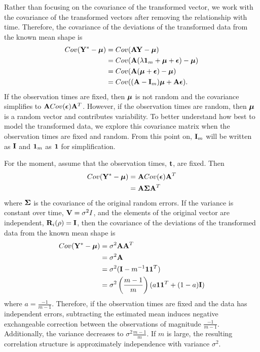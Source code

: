 Rather than focusing on the covariance of the transformed vector, we work with the covariance of the transformed vectors after removing the relationship with time. Therefore, the covariance of the deviations of the transformed data from the known mean shape is
\begin{align*}
Cov(\mathbf Y^{*} - \boldsymbol\mu) &= Cov(\mathbf A\mathbf Y - \boldsymbol\mu)\\
&= Cov(\mathbf A(\lambda\mathbf 1_{m} + \boldsymbol\mu + \boldsymbol\epsilon) - \boldsymbol\mu)\\
&= Cov(\mathbf A(\boldsymbol\mu + \boldsymbol\epsilon) - \boldsymbol\mu)\\
&= Cov((\mathbf A-\mathbf I_{m})\boldsymbol\mu + \mathbf A \boldsymbol\epsilon).
\end{align*}
If the observation times are fixed, then $\boldsymbol \mu$ is not random and the covariance simplifies to $\mathbf A Cov(\boldsymbol\epsilon)\mathbf A^{T}$. However, if the observation times are random, then $\boldsymbol \mu$ is a random vector and contributes variability. To better understand how best to model the transformed data, we explore this covariance matrix when the observation times are fixed and random. From this point on, $\mathbf I_{m}$ will be written as $\mathbf I$ and $\mathbf 1_{m}$ as $\mathbf 1$ for simplification.

For the moment, assume that the observation times, $\mathbf t$, are fixed. Then
\begin{align*}
Cov(\mathbf Y^{*} - \boldsymbol\mu)&= \mathbf ACov(\boldsymbol\epsilon)\mathbf A^{T}\\
&= \mathbf A\boldsymbol\Sigma \mathbf A^{T}
\end{align*}
where $\boldsymbol\Sigma$ is the covariance of the original random errors. If the variance is constant over time, $\mathbf V=\sigma^{2}I$, and the elements of the original vector are independent, $\mathbf R_{i}(\rho)=\mathbf I$, then the covariance of the deviations of the transformed data from the known mean shape is
\begin{align*} 
Cov(\mathbf Y^{*}- \boldsymbol\mu) &= \sigma^{2}\mathbf A\mathbf A^{T} \\
&=\sigma^{2}\mathbf A\\
&= \sigma^{2}(\mathbf I - m^{-1}\mathbf1\mathbf1^{T})\\
&=\sigma^{2}\left(\frac{m-1}{m}\right)(a\mathbf 1\mathbf 1^{T}+ (1-a)\mathbf I)
\end{align*}
 where $a=\frac{-1}{m-1}$. Therefore, if the observation times are fixed and the data has independent errors, subtracting the estimated mean induces negative exchangeable correction between the observations of magnitude $\frac{-1}{m-1}$. Additionally, the variance decreases to $\sigma^{2}\frac{m-1}{m}$. If $m$ is large, the resulting correlation structure is approximately independence with variance $\sigma^{2}$.
 
